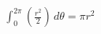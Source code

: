\documentclass[preview]{standalone}
\begin{document}
\begin{align*}
\int_0^{2\pi} \left(\frac{r^2}{2}\right) \, d\theta = \pi r^2
\end{align*}
\end{document}
